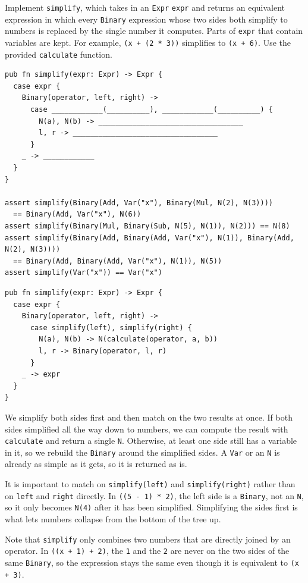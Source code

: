 \begin{blocksection}
\question Implement \texttt{simplify}, which takes in an \lstinline{Expr} \texttt{expr} and returns an equivalent expression in which every \lstinline{Binary} expression whose two sides both simplify to numbers is replaced by the single number it computes. Parts of \texttt{expr} that contain variables are kept. For example, \lstinline{(x + (2 * 3))} simplifies to \lstinline{(x + 6)}. Use the provided \texttt{calculate} function.
\begin{lstlisting}
pub fn simplify(expr: Expr) -> Expr {
  case expr {
    Binary(operator, left, right) ->
      case ____________(__________), ____________(__________) {
        N(a), N(b) -> __________________________________
        l, r -> __________________________________
      }
    _ -> ____________
  }
}

assert simplify(Binary(Add, Var("x"), Binary(Mul, N(2), N(3))))
  == Binary(Add, Var("x"), N(6))
assert simplify(Binary(Mul, Binary(Sub, N(5), N(1)), N(2))) == N(8)
assert simplify(Binary(Add, Binary(Add, Var("x"), N(1)), Binary(Add, N(2), N(3))))
  == Binary(Add, Binary(Add, Var("x"), N(1)), N(5))
assert simplify(Var("x")) == Var("x")
\end{lstlisting}

\begin{solution}
\begin{lstlisting}
pub fn simplify(expr: Expr) -> Expr {
  case expr {
    Binary(operator, left, right) ->
      case simplify(left), simplify(right) {
        N(a), N(b) -> N(calculate(operator, a, b))
        l, r -> Binary(operator, l, r)
      }
    _ -> expr
  }
}
\end{lstlisting}
\end{solution}

\begin{questionmeta}
  We simplify both sides first and then match on the two results at once. If both sides simplified all the way down to numbers, we can compute the result with \lstinline{calculate} and return a single \lstinline{N}. Otherwise, at least one side still has a variable in it, so we rebuild the \lstinline{Binary} around the simplified sides. A \lstinline{Var} or an \lstinline{N} is already as simple as it gets, so it is returned as is.

  It is important to match on \lstinline{simplify(left)} and \lstinline{simplify(right)} rather than on \texttt{left} and \texttt{right} directly. In \lstinline{((5 - 1) * 2)}, the left side is a \lstinline{Binary}, not an \lstinline{N}, so it only becomes \lstinline{N(4)} after it has been simplified. Simplifying the sides first is what lets numbers collapse from the bottom of the tree up.

  Note that \texttt{simplify} only combines two numbers that are directly joined by an operator. In \lstinline{((x + 1) + 2)}, the \texttt{1} and the \texttt{2} are never on the two sides of the same \lstinline{Binary}, so the expression stays the same even though it is equivalent to \lstinline{(x + 3)}.
\end{questionmeta}
\end{blocksection}